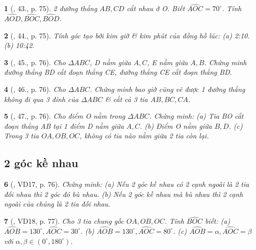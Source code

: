 \documentclass{article}
\newtheorem{baitoan}{}
\begin{document}
\begin{baitoan}[\cite{Binh_Toan_6_tap_2}, 43., p. 75]
	2 đường thẳng $AB,CD$ cắt nhau ở O. Biết $\widehat{AOC} = 70^\circ$. Tính $\widehat{AOD},\widehat{BOC},\widehat{BOD}$.
\end{baitoan}

\begin{baitoan}[\cite{Binh_Toan_6_tap_2}, 44., p. 75]
	Tính góc tạo bởi kim giờ \& kim phút của đồng hồ lúc: (a) {\rm2:10}. (b) {\rm10:42}.
\end{baitoan}

\begin{baitoan}[\cite{Binh_Toan_6_tap_2}, 45., p. 76]
	Cho $\Delta ABC$, D nằm giữa $A,C$, E nằm giữa $A,B$. Chứng minh đường thẳng BD cắt đoạn thẳng CE, đường thẳng CE cắt đoạn thẳng BD.
\end{baitoan}

\begin{baitoan}[\cite{Binh_Toan_6_tap_2}, 46., p. 76]
	Cho $\Delta ABC$. Chứng minh bao giờ cũng vẽ được 1 đường thẳng không đi qua 3 đỉnh của $\Delta ABC$ \& cắt cả 3 tia $AB,BC,CA$.
\end{baitoan}

\begin{baitoan}[\cite{Binh_Toan_6_tap_2}, 47., p. 76]
	Cho điểm O nằm trong $\Delta ABC$. Chứng minh: (a) Tia BO cắt đoạn thẳng AB tại 1 điểm D nằm giữa $A,C$. (b) Điểm O nằm giữa $B,D$. (c) Trong 3 tia $OA,OB,OC$, không có tia nào nằm giữa 2 tia còn lại.
\end{baitoan}


\subsection{2 góc kề nhau}

\begin{baitoan}[\cite{Binh_Toan_6_tap_2}, VD17, p. 76]
	Chứng minh: (a) Nếu 2 góc kề nhau có 2 cạnh ngoài là 2 tia đối nhau thì 2 góc đó bù nhau. (b) Nếu 2 góc kề nhau mà bù nhau thì 2 cạnh ngoài của chúng là 2 tia đối nhau.
\end{baitoan}

\begin{baitoan}[\cite{Binh_Toan_6_tap_2}, VD18, p. 77]
	Cho 3 tia chung gốc $OA,OB,OC$. Tính $\widehat{BOC}$ biết: (a) $\widehat{AOB} = 130^\circ,\widehat{AOC} = 30^\circ$. (b) $\widehat{AOB} = 130^\circ,\widehat{AOC} = 80^\circ$. (c) $\widehat{AOB} = \alpha,\widehat{AOC} = \beta$ với $\alpha,\beta\in(0^\circ,180^\circ)$.
\end{baitoan}
\end{document}
